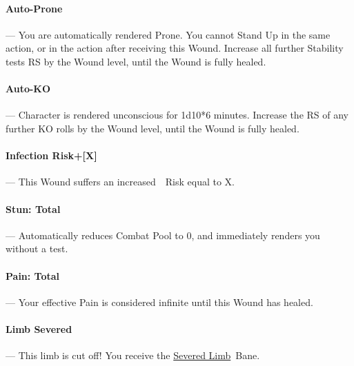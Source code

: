 \documentclass[oneside,11pt,english]{book}
\begin{document}
\vspace{-5pt}\paragraph{\label{par:Auto-Prone}Auto-Prone}---\quad
You are automatically rendered Prone. You cannot Stand Up in the same action, or in the action after receiving this Wound. Increase all further Stability tests RS by the Wound level, until the Wound is fully healed.

\vspace{-5pt}\paragraph{\label{par:Auto-KO}Auto-KO}---\quad
Character is rendered unconscious for 1d10*6 minutes. Increase the RS of any further KO rolls by the Wound level, until the Wound is fully healed.

\vspace{-5pt}\paragraph[Infection Risk]{\label{par:Infection Risk}Infection Risk+[X]}---\quad
This Wound suffers an increased~~Risk equal to X.

\vspace{-5pt}\paragraph[Total]{\label{par:Stun: Total}Stun: Total}---\quad
Automatically reduces Combat Pool to 0, and immediately renders you  without a test.

\vspace{-5pt}\paragraph[Total]{\label{par:Pain: Total}Pain: Total}---\quad
Your effective Pain is considered infinite until this Wound has healed.

\vspace{-5pt}\paragraph[Limb Severed!]{\label{par:Limb Severed}Limb Severed}---\quad
This limb is cut off! You receive the \hyperref[bane:Severed Limb/Appendage]{Severed Limb}~Bane. 
\end{document}
